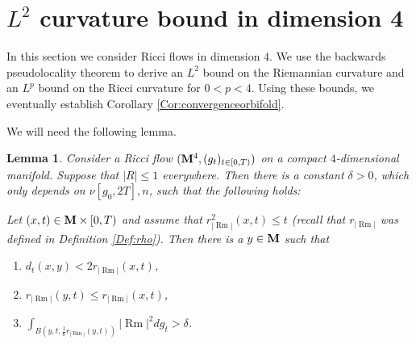\documentclass[11pt]{amsart}
\numberwithin{equation}{section}
\newtheorem{lemma}[theorem]{Lemma}
\def\M{{\bf M}}
\DeclareMathOperator{\Rm}{Rm}
\newcommand{\rrm}{r_{|{\Rm}|}}
\numberwithin{equation}{section}
\begin{document}
\section{$L^2$ curvature bound in dimension 4} \label{sec:L2bound}
In this section we consider Ricci flows in dimension $4$.
We use the backwards pseudolocality theorem to derive an $L^2$ bound on the Riemannian curvature and an $L^p$ bound on the Ricci curvature for $0 < p < 4$.
Using these bounds, we eventually establish Corollary \ref{Cor:convergenceorbifold}.

We will need the following lemma.

\begin{lemma} \label{Lem:picay}
Consider a Ricci flow $(\M^4, (g_t)_{t \in [0,T)})$ on a compact $4$-dimensional manifold.
Suppose that $|R| \leq 1$ everywhere.
Then there is a constant $\delta > 0$, which only depends on $\nu[g_0, 2T], n$, such that the following holds:

Let $(x, t) \in \M \times [0,T)$ and assume that $\rrm^2 (x, t) \leq t$ (recall that $\rrm$ was defined in Definition \ref{Def:rho}).
Then there is a $y \in \M$ such that
\begin{enumerate}[label=(\alph*)]
\item $d_t (x,y) < 2 \rrm (x, t)$,
\item $\rrm (y, t) \leq \rrm (x, t)$,
\item $\int_{B(y, t, \frac16 \rrm (y,t))} |{\Rm}|^2 dg_t > \delta$.
\end{enumerate}
\end{lemma}
\end{document}
